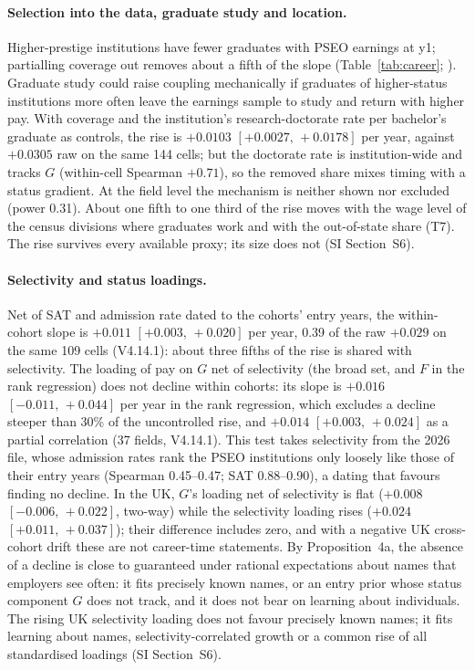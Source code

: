 \documentclass[11pt]{article}
\newcommand{\SI}[1]{SI Section~S#1}
\newcommand{\ci}[2]{$[#1,\allowbreak\,#2]$}
\begin{document}
\paragraph{Selection into the data, graduate study and location.} Higher-prestige institutions have fewer
graduates with PSEO earnings at y1; partialling coverage out removes about a fifth of the slope
(Table~\ref{tab:career}; \citealp[cf.][]{foote2026attrition}). Graduate study could raise coupling mechanically if graduates of higher-status institutions more often leave the
earnings sample to study and return with higher pay. With coverage and the institution's research-doctorate rate per
bachelor's graduate as controls, the rise is $+0.0103$ \ci{+0.0027}{+0.0178} per year, against $+0.0305$ raw on the
same 144 cells; but the doctorate rate is institution-wide and tracks $G$ (within-cell Spearman $+0.71$), so the
removed share mixes timing with a status gradient. At the field level the mechanism is neither shown nor excluded
(power 0.31). About one fifth to one third of the rise moves with the wage level of the census divisions where
graduates work and with the out-of-state share (T7). The rise survives every available proxy; its size does not
(\SI{6}).

\paragraph{Selectivity and status loadings.} Net of SAT and admission rate dated to the cohorts' entry years, the
within-cohort slope is $+0.011$ \ci{+0.003}{+0.020} per year, 0.39 of the raw $+0.029$ on the same 109 cells
(V4.14.1): about three fifths of the rise is shared with selectivity. The loading of pay on $G$ net of selectivity
(the broad set, and $F$ in the rank regression) does not decline within
cohorts: its slope is $+0.016$ \ci{-0.011}{+0.044} per year in the rank regression, which excludes a decline
steeper than 30\% of the uncontrolled rise, and $+0.014$ \ci{+0.003}{+0.024} as a partial correlation (37 fields,
V4.14.1). This test takes selectivity from the 2026 file, whose admission rates rank the PSEO institutions only
loosely like those of their entry years (Spearman 0.45--0.47; SAT 0.88--0.90), a dating that favours finding no
decline. In the UK, $G$'s loading net of selectivity is flat ($+0.008$ \ci{-0.006}{+0.022}, two-way) while the
selectivity loading rises ($+0.024$ \ci{+0.011}{+0.037}); their difference includes zero, and with a negative UK
cross-cohort drift these are not career-time statements. By Proposition~4a, the absence of a decline is close to guaranteed under rational expectations about names that
employers see often: it fits precisely known names, or an entry prior whose status component $G$ does not track, and it does
not bear on learning about individuals. The rising UK selectivity loading does not favour precisely known names;
it fits learning about names, selectivity-correlated growth or a common rise of all standardised loadings
(\SI{6}).
\end{document}
